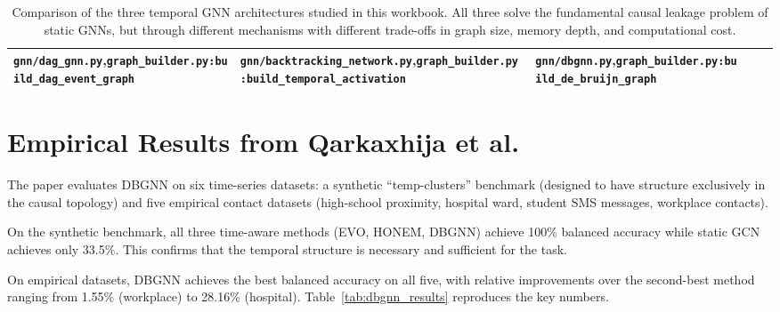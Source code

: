 \begin{table}[H]
\begin{tabular}{p{2.6cm} p{3.2cm} p{2.8cm} p{2.8cm} p{3.2cm}}
\texttt{gnn/dag\_gnn.py},\newline \texttt{graph\_builder.py:\allowbreak build\_dag\_event\_graph} &
\texttt{gnn/backtracking\_network.py},\newline \texttt{graph\_builder.py:\allowbreak build\_temporal\_activation} &
\texttt{gnn/dbgnn.py},\newline \texttt{graph\_builder.py:\allowbreak build\_de\_bruijn\_graph} \\
\bottomrule
\end{tabular}
\caption{Comparison of the three temporal GNN architectures studied in this workbook. All three
solve the fundamental causal leakage problem of static GNNs, but through different mechanisms
with different trade-offs in graph size, memory depth, and computational cost.}
\label{tab:temporal_arch_comparison}
\end{table}

\section{Empirical Results from Qarkaxhija et al.}

The paper evaluates DBGNN on six time-series datasets: a synthetic ``temp-clusters'' benchmark
(designed to have structure exclusively in the causal topology) and five empirical contact
datasets (high-school proximity, hospital ward, student SMS messages, workplace contacts).

On the synthetic benchmark, all three time-aware methods (EVO, HONEM, DBGNN) achieve 100\%
balanced accuracy while static GCN achieves only 33.5\%. This confirms that the temporal
structure is necessary and sufficient for the task.

On empirical datasets, DBGNN achieves the best balanced accuracy on all five, with relative
improvements over the second-best method ranging from 1.55\% (workplace) to 28.16\% (hospital).
Table~\ref{tab:dbgnn_results} reproduces the key numbers.

